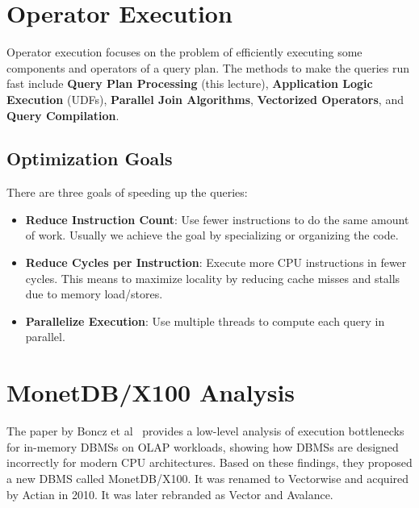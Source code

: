 \documentclass[11pt]{article}
\begin{document}
\maketitle
\thispagestyle{plain}

\section{Operator Execution}
Operator execution focuses on the problem of efficiently executing some components and operators of 
a query plan. The methods to make the queries run fast include \textbf{Query Plan Processing} (this 
lecture), \textbf{Application Logic Execution} (UDFs), \textbf{Parallel Join Algorithms}, 
\textbf{Vectorized Operators}, and \textbf{Query Compilation}.

\subsection*{Optimization Goals}
There are three goals of speeding up the queries:
\begin{itemize}
    \item \textbf{Reduce Instruction Count}: 
    Use fewer instructions to do the same amount of work. 
    Usually we achieve the goal by specializing or organizing the code.
    \item \textbf{Reduce Cycles per Instruction}: 
    Execute more CPU instructions in fewer cycles. 
    This means to maximize locality by reducing cache misses and stalls due to memory load/stores.
    \item \textbf{Parallelize Execution}: 
    Use multiple threads to compute each query in parallel.
\end{itemize}

\section{MonetDB/X100 Analysis}
The paper by Boncz et al~\cite{Boncz2005} provides a low-level analysis of execution  
bottlenecks for in-memory DBMSs on OLAP workloads, showing how DBMSs are designed incorrectly for 
modern CPU architectures. Based on these findings, they proposed a new DBMS called MonetDB/X100. 
It was renamed to Vectorwise and acquired by Actian in 2010. It was later rebranded as Vector and 
Avalance.
\end{document}
